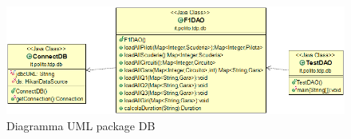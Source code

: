 \begin{figure}[h]
\centering
\includegraphics[width=1\linewidth]{images/Diagramma UML package DB.png}
\caption{Diagramma UML package DB}
\label{fig:Diagramma UML package DB}
\end{figure}
